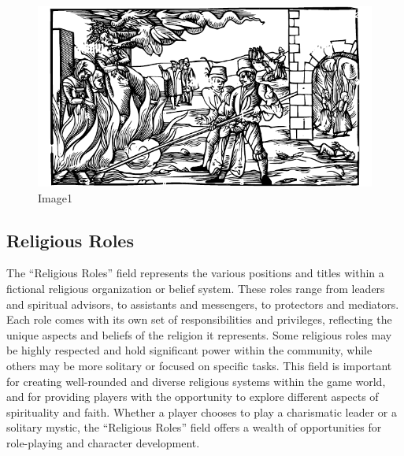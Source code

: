\begin{figure}
\centering
\includegraphics{./images/religion04.pdf}
\caption{Image1}
\end{figure}

\hypertarget{religious-roles}{%
\subsection{Religious Roles}\label{religious-roles}}

The ``Religious Roles'' field represents the various positions and
titles within a fictional religious organization or belief system. These
roles range from leaders and spiritual advisors, to assistants and
messengers, to protectors and mediators. Each role comes with its own
set of responsibilities and privileges, reflecting the unique aspects
and beliefs of the religion it represents. Some religious roles may be
highly respected and hold significant power within the community, while
others may be more solitary or focused on specific tasks. This field is
important for creating well-rounded and diverse religious systems within
the game world, and for providing players with the opportunity to
explore different aspects of spirituality and faith. Whether a player
chooses to play a charismatic leader or a solitary mystic, the
``Religious Roles'' field offers a wealth of opportunities for
role-playing and character development.

